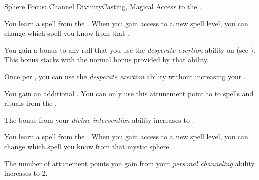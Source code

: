     \begin{feat}{Sphere Focus: Channel Divinity}{Casting, Magical}
        \featpre Access to the  .

         You learn a spell from the  .
        When you gain access to a new spell level, you can change which spell you know from that .

         You gain a  bonus to any roll that you use the \textit{desperate exertion} ability on (see ).
        This bonus stacks with the normal  bonus provided by that ability.

         Once per , you can use the \textit{desperate exertion} ability without increasing your .

         You gain an additional .
        You can only use this attunement point to  to spells and rituals from the  .

         The bonus from your \textit{divine intervention} ability increases to .

         You learn a spell from the  .
        When you gain access to a new spell level, you can change which spell you know from that mystic sphere.

         The number of attunement points you gain from your \textit{personal channeling} ability increases to 2.
    \end{feat}

